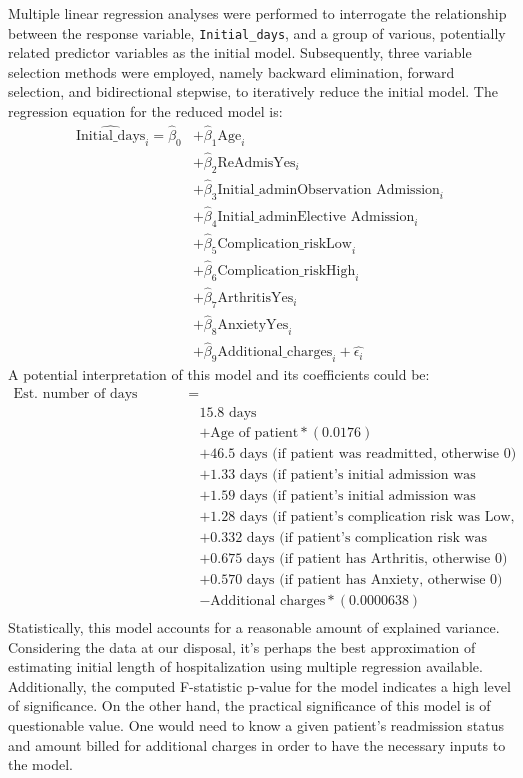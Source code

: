 \documentclass[
]{article}
\begin{document}
Multiple linear regression analyses were performed to interrogate the
relationship between the response variable, \texttt{Initial\_days}, and
a group of various, potentially related predictor variables as the
initial model. Subsequently, three variable selection methods were
employed, namely backward elimination, forward selection, and
bidirectional stepwise, to iteratively reduce the initial model. The
regression equation for the reduced model is: \[
\begin{align}
\hat{\text{Initial_days}}_i = \hat{\beta}_0
    &+ \hat{\beta}_1 \text{Age}_i \\
    &+ \hat{\beta}_2 \text{ReAdmisYes}_i \\
    &+ \hat{\beta}_3 \text{Initial_adminObservation Admission}_i \\
    &+ \hat{\beta}_4 \text{Initial_adminElective Admission}_i \\
    &+ \hat{\beta}_5 \text{Complication_riskLow}_i \\
    &+ \hat{\beta}_6 \text{Complication_riskHigh}_i \\
    &+ \hat{\beta}_7 \text{ArthritisYes}_i \\
    &+ \hat{\beta}_8 \text{AnxietyYes}_i \\
    &+ \hat{\beta}_9 \text{Additional_charges}_i + \hat{\epsilon_i}
\end{align}
\] A potential interpretation of this model and its coefficients could
be: \[
\begin{align}
\text{Est. number of days initially hospitalized} = \\
    & \text{15.8 days} \\
    &+ \text{Age of patient}*(0.0176) \\
    &+ \text{46.5 days (if patient was readmitted, otherwise 0)} \\
    &+ \text{1.33 days (if patient's initial admission was Observation, otherwise 0)} \\
    &+ \text{1.59 days (if patient's initial admission was Elective, otherwise 0)} \\
    &+ \text{1.28 days (if patient's complication risk was Low, otherwise 0)} \\
    &+ \text{0.332 days (if patient's complication risk was High, otherwise 0)} \\
    &+ \text{0.675 days (if patient has Arthritis, otherwise 0)} \\
    &+ \text{0.570 days (if patient has Anxiety, otherwise 0)} \\
    &- \text{Additional charges}*(0.0000638) \\
\end{align}
\] Statistically, this model accounts for a reasonable amount of
explained variance. Considering the data at our disposal, it's perhaps
the best approximation of estimating initial length of hospitalization
using multiple regression available. Additionally, the computed
F-statistic p-value for the model indicates a high level of
significance. On the other hand, the practical significance of this
model is of questionable value. One would need to know a given patient's
readmission status and amount billed for additional charges in order to
have the necessary inputs to the model.
\end{document}
